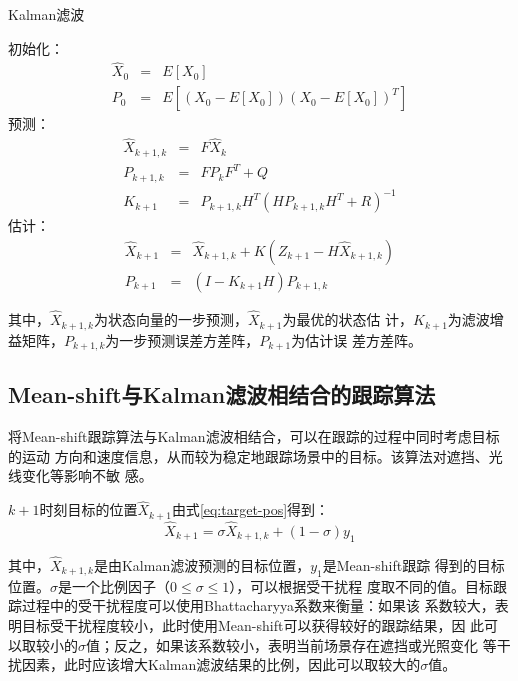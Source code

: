 \begin{algorithm}[htbp]
  \caption{Kalman滤波}
  \label{alg:kalman}
  \begin{algorithmic}[1]
    \STATE 初始化：
    \begin{eqnarray*}
      \hat{X}_0&=&E[X_0]\\
      P_0&=&E[(X_0-E[X_0])(X_0-E[X_0])^{T}]
    \end{eqnarray*}
    \STATE 预测：
    \begin{eqnarray*}
      \hat{X}_{k+1,k}&=&F \hat{X}_{k}\\ 
      P_{k+1,k}&=&F P_{k}F^{T}+Q\\
      K_{k+1}&=&P_{k+1,k}H^{T}(H P_{k+1,k}H^{T}+R)^{-1}
    \end{eqnarray*}
    \STATE 估计：
    \begin{eqnarray*}
      \hat{X}_{k+1}&=&\hat{X}_{k+1,k}+K(Z_{k+1}-H\hat{X}_{k+1,k})\\
      P_{k+1}&=&(I-K_{k+1}H)P_{k+1,k}
    \end{eqnarray*}
  \end{algorithmic}
\end{algorithm}

其中，$\hat{X}_{k+1, k}$为状态向量的一步预测，$\hat{X}_{k+1}$为最优的状态估
计，$K_{k+1}$为滤波增益矩阵，$P_{k+1, k}$为一步预测误差方差阵，$P_{k+1}$为估计误
差方差阵。

\subsection{Mean-shift与Kalman滤波相结合的跟踪算法}
\label{sec:combine}

将Mean-shift跟踪算法与Kalman滤波相结合，可以在跟踪的过程中同时考虑目标的运动
方向和速度信息，从而较为稳定地跟踪场景中的目标。该算法对遮挡、光线变化等影响不敏
感。

$k+1$时刻目标的位置$\hat{X}_{k+1}$由式\ref{eq:target-pos}得到：
\begin{equation}
  \label{eq:target-pos}
  \hat{X}_{k+1}=\sigma \hat{X}_{k+1,k}+(1-\sigma)y_1
\end{equation}

其中，$\hat{X}_{k+1,k}$是由Kalman滤波预测的目标位置，$y_1$是Mean-shift跟踪
得到的目标位置。$\sigma$是一个比例因子（$0 \le \sigma \le 1$），可以根据受干扰程
度取不同的值。目标跟踪过程中的受干扰程度可以使用Bhattacharyya系数来衡量：如果该
系数较大，表明目标受干扰程度较小，此时使用Mean-shift可以获得较好的跟踪结果，因
此可以取较小的$\sigma$值；反之，如果该系数较小，表明当前场景存在遮挡或光照变化
等干扰因素，此时应该增大Kalman滤波结果的比例，因此可以取较大的$\sigma$值。

